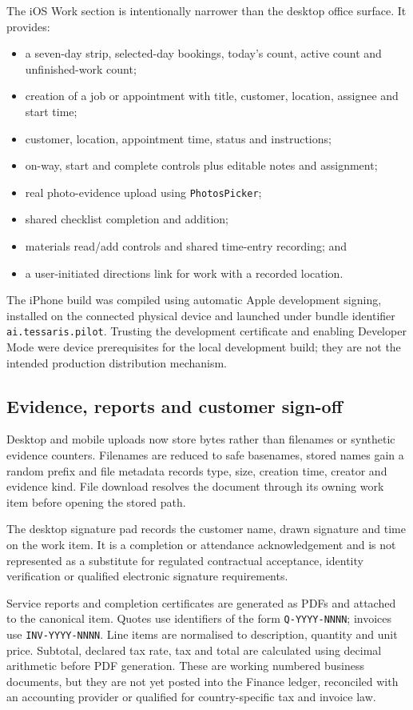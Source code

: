 The iOS Work section is intentionally narrower than the desktop office surface.
It provides:
\begin{itemize}[leftmargin=*]
  \item a seven-day strip, selected-day bookings, today's count, active count and
        unfinished-work count;
  \item creation of a job or appointment with title, customer, location,
        assignee and start time;
  \item customer, location, appointment time, status and instructions;
  \item on-way, start and complete controls plus editable notes and assignment;
  \item real photo-evidence upload using \texttt{PhotosPicker};
  \item shared checklist completion and addition;
  \item materials read/add controls and shared time-entry recording; and
  \item a user-initiated directions link for work with a recorded location.
\end{itemize}

The iPhone build was compiled using automatic Apple development signing,
installed on the connected physical device and launched under bundle identifier
\texttt{ai.tessaris.pilot}.  Trusting the development certificate and enabling
Developer Mode were device prerequisites for the local development build; they
are not the intended production distribution mechanism.

\subsection{Evidence, reports and customer sign-off}

Desktop and mobile uploads now store bytes rather than filenames or synthetic
evidence counters.  Filenames are reduced to safe basenames, stored names gain a
random prefix and file metadata records type, size, creation time, creator and
evidence kind.  File download resolves the document through its owning work item
before opening the stored path.

The desktop signature pad records the customer name, drawn signature and time on
the work item.  It is a completion or attendance acknowledgement and is not
represented as a substitute for regulated contractual acceptance, identity
verification or qualified electronic signature requirements.

Service reports and completion certificates are generated as PDFs and attached
to the canonical item.  Quotes use identifiers of the form
\texttt{Q-YYYY-NNNN}; invoices use \texttt{INV-YYYY-NNNN}.  Line items are
normalised to description, quantity and unit price.  Subtotal, declared tax rate,
tax and total are calculated using decimal arithmetic before PDF generation.
These are working numbered business documents, but they are not yet posted into
the Finance ledger, reconciled with an accounting provider or qualified for
country-specific tax and invoice law.

